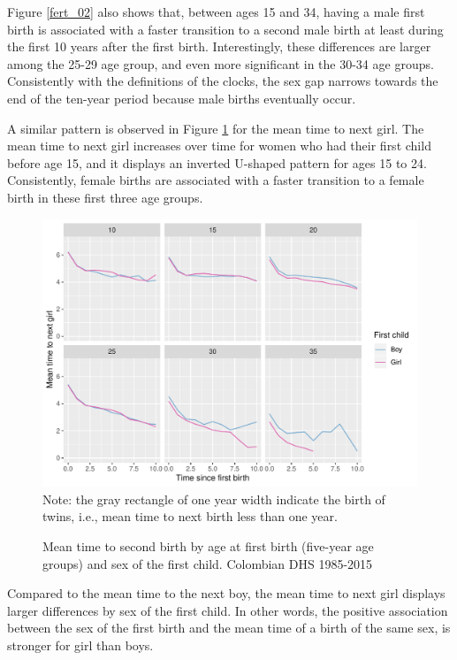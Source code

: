 \documentclass{article}
\begin{document}
Figure \ref{fert_02} also shows that, between ages 15 and 34, having a male first birth is associated with a faster transition to a second male birth at least during the first 10 years after the first birth. Interestingly, these differences are larger among the 25-29 age group, and even more significant in the 30-34 age groups. Consistently with the definitions of the clocks, the sex gap narrows towards the end of the ten-year period because male births eventually occur. 

A similar pattern is observed in Figure \ref{fert_03} for the mean time to next girl. The mean time to next girl increases over time for women who had their first child before age 15, and it displays an inverted U-shaped pattern for ages 15 to 24. Consistently, female births are associated with a faster transition to a female birth in these first three age groups.

\begin{figure}[H]
    \centering
    \caption{Mean time to second birth by age at first birth (five-year age groups) and sex of the first child. Colombian DHS 1985-2015}
    \includegraphics[scale=0.8]{Figures/mt_second_gir_by_sex_first_cohort.pdf}\\
    \label{fert_03}
    Note: the gray rectangle of one year width indicate the birth of twins, i.e., mean time to next birth less than one year.
\end{figure}

Compared to the mean time to the next boy, the mean time to next girl displays larger differences by sex of the first child. In other words, the positive association between the sex of the first birth and the mean time of a birth of the same sex, is stronger for girl than boys.
\end{document}
